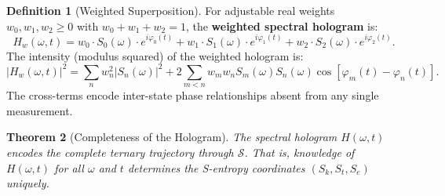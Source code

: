\documentclass[11pt,a4paper]{article}
\newtheorem{theorem}{Theorem}[section]
\theoremstyle{definition}
\newtheorem{definition}[theorem]{Definition}
\theoremstyle{remark}
\newcommand{\Sk}{S_k}
\newcommand{\St}{S_t}
\newcommand{\Se}{S_e}
\newcommand{\Sspace}{\mathcal{S}}
\begin{document}
\begin{definition}[Weighted Superposition]
\label{def:weighted}
For adjustable real weights $w_0, w_1, w_2 \geq 0$ with $w_0 + w_1 + w_2 = 1$, the \textbf{weighted spectral hologram} is:
\begin{equation}
H_w(\omega, t) = w_0 \cdot S_0(\omega) \cdot e^{i\varphi_0(t)} + w_1 \cdot S_1(\omega) \cdot e^{i\varphi_1(t)} + w_2 \cdot S_2(\omega) \cdot e^{i\varphi_2(t)}.
\end{equation}
The intensity (modulus squared) of the weighted hologram is:
\begin{equation}
\label{eq:hologram_intensity}
|H_w(\omega,t)|^2 = \sum_{n} w_n^2 |S_n(\omega)|^2 + 2\sum_{m < n} w_m w_n S_m(\omega) S_n(\omega) \cos[\varphi_m(t) - \varphi_n(t)].
\end{equation}
The cross-terms encode inter-state phase relationships absent from any single measurement.
\end{definition}

\begin{theorem}[Completeness of the Hologram]
\label{thm:complete}
The spectral hologram $H(\omega, t)$ encodes the complete ternary trajectory through $\Sspace$. That is, knowledge of $H(\omega, t)$ for all $\omega$ and $t$ determines the S-entropy coordinates $(\Sk, \St, \Se)$ uniquely.
\end{theorem}
\end{document}
